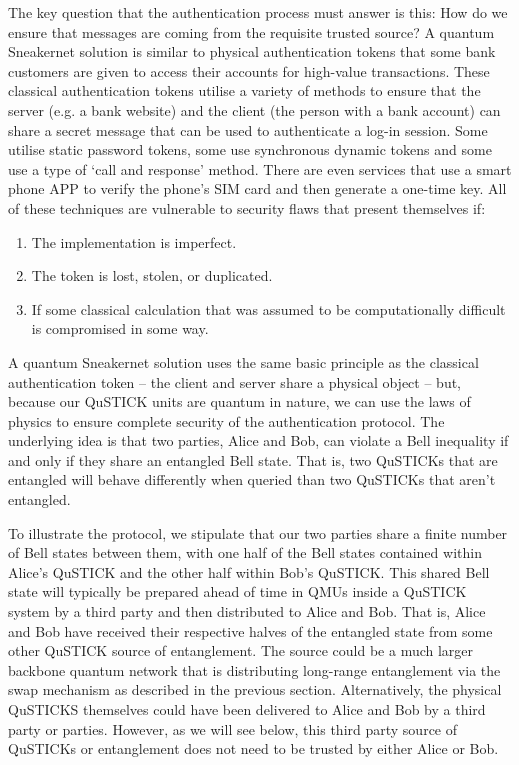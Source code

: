 \documentclass[twocolumn, aps, rmp, amsmath, amssymb, nofootinbib, superscriptaddress, longbibliography, floatfix, table-of-contents, eqsecnum]{revtex4-2}
\begin{document}
The key question that the authentication process must answer is this: How do we ensure that messages are coming from the requisite trusted source? A quantum Sneakernet solution is similar to physical authentication tokens that some bank customers are given to access their accounts for high-value transactions. These classical authentication tokens utilise a variety of methods to ensure that the server (e.g. a bank website) and the client (the person with a bank account) can share a secret message that can be used to authenticate a log-in session. Some utilise static password tokens, some use synchronous dynamic tokens and some use a type of `call and response' method. There are even services that use a smart phone APP to verify the phone's SIM card and then generate a one-time key. All of these techniques are vulnerable to security flaws that present themselves if:
\begin{enumerate}
\item The implementation is imperfect.
\item The token is lost, stolen, or duplicated.
\item If some classical calculation that was assumed to be computationally difficult is compromised in some way. 
\end{enumerate}

A quantum Sneakernet solution uses the same basic principle as the classical authentication token -- the client and server share a physical object -- but, because our QuSTICK units are quantum in nature, we can use the laws of physics to ensure complete security of the authentication protocol. The underlying idea is that two parties, Alice and Bob, can violate a Bell inequality if and only if they share an entangled Bell state. That is, two QuSTICKs that are entangled will behave differently when queried than two QuSTICKs that aren't entangled.

To illustrate the protocol, we stipulate that our two parties share a finite number of Bell states between them, with one half of the Bell states contained within Alice's QuSTICK and the other half within Bob's QuSTICK. This shared Bell state will typically be prepared ahead of time in QMUs inside a QuSTICK system by a third party and then distributed to Alice and Bob. That is, Alice and Bob have received their respective halves of the entangled state from some other QuSTICK source of entanglement. The source could be a much larger backbone quantum network that is distributing long-range entanglement via the swap mechanism as described in the previous section. Alternatively, the physical QuSTICKS themselves could have been delivered to Alice and Bob by a third party or parties. However, as we will see below, this third party source of QuSTICKs or entanglement does not need to be trusted by either Alice or Bob.
\end{document}
